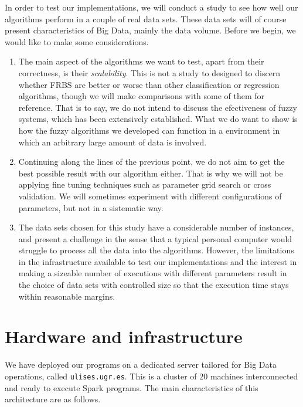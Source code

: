 %
%
%

In order to test our implementations, we will conduct a study to see how well our algorithms perform in a couple of real data sets. These data sets will of course present characteristics of Big Data, mainly the data volume. Before we begin, we would like to make some considerations.

\begin{enumerate}[1.]
  \item The main aspect of the algorithms we want to test, apart from their correctness, is their \textit{scalability}. This is not a study to designed to discern whether FRBS are better or worse than other classification or regression algorithms, though we will make comparisons with some of them for reference. That is to say, we do not intend to discuss the efectiveness of fuzzy systems, which has been extensively established. What we do want to show is how the fuzzy algorithms we developed can function in a environment in which an arbitrary large amount of data is involved.
  \item Continuing along the lines of the previous point, we do not aim to get the best possible result with our algorithm either. That is why we will not be applying fine tuning techniques such as parameter grid search or cross validation. We will sometimes experiment with different configurations of parameters, but not in a sistematic way.
  \item The data sets chosen for this study have a considerable number of instances, and present a challenge in the sense that a typical personal computer would struggle to process all the data into the algorithms. However, the limitations in the infrastructure available to test our implementations and the interest in making a sizeable number of executions with different parameters result in the choice of data sets with controlled size so that the execution time stays within reasonable margins.
\end{enumerate}

\section{Hardware and infrastructure}

We have deployed our programs on a dedicated server tailored for Big Data operations, called \verb|ulises.ugr.es|. This is a cluster of 20 machines interconnected and ready to execute Spark programs. The main characteristics of this architecture are as follows.

